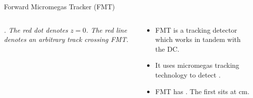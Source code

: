\begin{frame}{Forward Micromegas Tracker (FMT)}
    \label{10.34::fmt}

    \begin{columns}[onlytextwidth,T]

    \begin{column}{.50\linewidth}
        \vspace{-12pt}
        \begin{figure}[t]
        \end{figure}
        \vspace{-21pt}
        \scriptsize{\textit{
            .
            The red dot denotes $z=0$.
            The red line denotes an arbitrary track crossing FMT.
        }}

    \end{column}

    \begin{column}{.48\linewidth}
        \vspace{24pt}
        \begin{itemize}
            \item
                FMT is a tracking detector which works in tandem with the DC.

            \vspace{12pt}
            \item
                It uses micromegas tracking technology to detect .

            \vspace{12pt}
            \item
                FMT has .
                The first sits at  \textcolor{efd_green}{cm}.
        \end{itemize}
    \end{column}

    \end{columns}
\end{frame}
